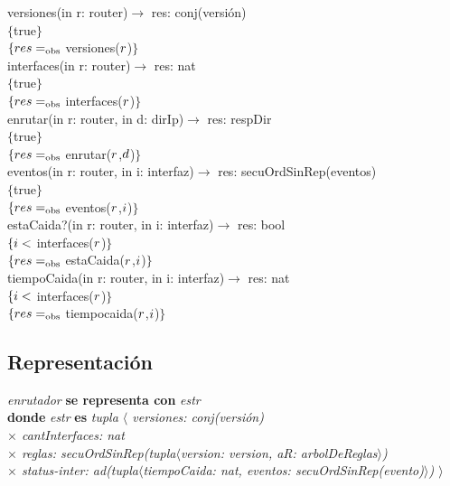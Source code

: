 versiones(in r: router)$\longrightarrow$ res: conj(versi\'on)\\
$\{$true$\}$\\
$\{{res}=_{\mathrm{obs}}$ versiones(${r}$)$\}$\\

interfaces(in r: router)$\longrightarrow$ res: nat\\
$\{$true$\}$\\
$\{{res} =_{\mathrm{obs}}$ interfaces(${r}$)$\}$\\

enrutar(in r: router, in d: dirIp)$\longrightarrow$ res: respDir\\
$\{$true$\}$\\
$\{{res} =_{\mathrm{obs}}$ enrutar(${r}$,${d}$)$\}$\\

eventos(in r: router, in i: interfaz)$\longrightarrow$ res: secuOrdSinRep(eventos)\\
$\{$true$\}$\\
$\{{res} =_{\mathrm{obs}}$ eventos(${r}$,${i}$)$\}$\\

estaCaida?(in r: router, in i: interfaz)$\longrightarrow$ res: bool\\
$\{{i} <$ interfaces(${r}$)$\}$\\
$\{{res} =_{\mathrm{obs}}$ estaCaida(${r}$,${i}$)$\}$\\

tiempoCaida(in r: router, in i: interfaz)$\longrightarrow$ res: nat\\
$\{{i} <$ interfaces(${r}$)$\}$\\
$\{{res} =_{\mathrm{obs}}$ tiempocaida(${r}$,${i}$)$\}$\\


\subsection*{Representaci\'on}
\textit{enrutador} \textbf{se representa con} \textit{estr}\\
\textbf{donde} \textit{estr} \textbf{es} \textit{tupla $\langle$ versiones: conj(versi\'on)\\
\hspace*{3.5cm} $\times$  cantInterfaces: nat\\
\hspace*{3.5cm} $\times$  reglas: secuOrdSinRep(tupla$\langle$version: version, aR: arbolDeReglas$\rangle$)\\ %
\hspace*{3.5cm} $\times$  status-inter: ad(tupla$\langle$tiempoCaida: nat, eventos: secuOrdSinRep(evento)$\rangle$) $\rangle$}


